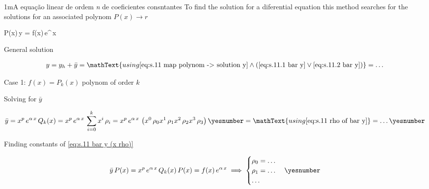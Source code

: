 \documentclass["AM3C-Slides_annotations.tex"]{subfiles}
\begin{document}
\begin{sectionBox}1m{A equação linear de ordem \textit{n} de coeficientes consntantes} %
  To find the solution for a diferential equation this method searches for the solutions for an associated polynom \(P(x) \to r\)

  \begin{BM}
    P(x)\,y = f(x)\,e^{\alpha\,x}
  \end{BM}

  General solution
  \begin{tcolorbox}
    \begin{gather*}
      y = y_h + \bar{y}
      = \mathText{using
        \eqref{eq:s.11 map polynom -> solution y}
        \land
        (
          \eqref{eq:s.11.1 bar y}
          \lor
          \eqref{eq:s.11.2 bar y}
        )
      }
      = \dots
    \end{gather*}
  \end{tcolorbox}

  Case 1: \(f(x) = P_k(x)\) polynom of order \(k\)
  \begin{tcolorbox}
    Solving for \(\bar{y}\)
    \begin{tcolorbox}
      \begin{gather*}
        \bar{y}
        = x^p\,e^{\alpha\,x}
        \,Q_k(x)
        = x^p\,e^{\alpha\,x}
        \,\sum_{i=0}^{k}{
          x^i\,\rho_i
        }
        = x^p\,e^{\alpha\,x}
        \,\left(
          x^0\,\rho_0
          x^1\,\rho_1
          x^2\,\rho_2
          x^3\,\rho_3
        \right)
        \yesnumber\label{eq:s.11 bar y (x rho)}
        = \mathText{using \eqref{eq:s.11 rho of bar y}}
        = \dots
        \yesnumber\label{eq:s.11.1 bar y}
      \end{gather*}
    \end{tcolorbox}

    Finding constants of \eqref{eq:s.11 bar y (x rho)}
    \begin{tcolorbox}
      \begin{gather*}
        \bar{y}\,P(x)
        = x^p\,e^{\alpha\,x}\,Q_k(x)
        \,P(x)
        = f(x)\,e^{\alpha\,x}
        \implies
        \begin{cases}
          \rho_0 = \dots
          \\ \rho_1 = \dots
          \\ \dots
        \end{cases}
        \yesnumber\label{eq:s.11 rho of bar y}
      \end{gather*}
    \end{tcolorbox}
  \end{tcolorbox}


\end{sectionBox}
\end{document}
